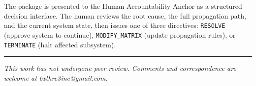 \documentclass[12pt]{article}
\begin{document}
The package is presented to the Human Accountability Anchor as a structured decision interface. The human reviews the root cause, the full propagation path, and the current system state, then issues one of three directives: \texttt{RESOLVE} (approve system to continue), \texttt{MODIFY\_MATRIX} (update propagation rules), or \texttt{TERMINATE} (halt affected subsystem).





\vspace{2em}
\hrule
\vspace{0.5em}
\noindent\small\textit{This work has not undergone peer review. Comments and correspondence are welcome at bxthre3inc@gmail.com.}
\end{document}
